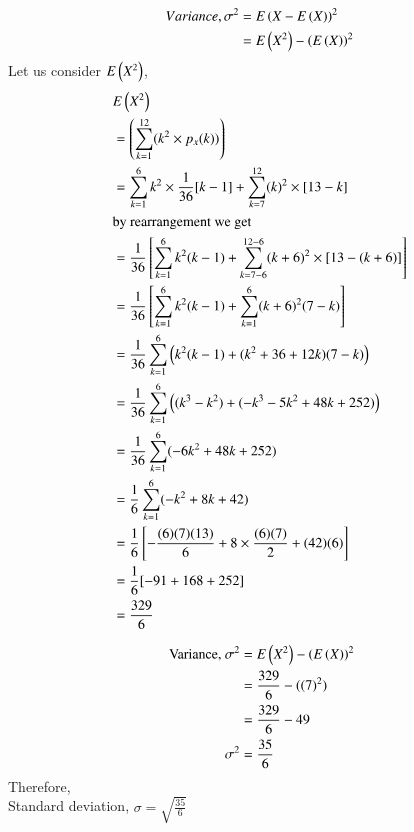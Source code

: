 \documentclass[journal,12pt,twocolumn]{IEEEtran}
\begin{document}
\begin{align}
  Variance,\sigma^2 &= E\left(X-E\left(X\right)\right)^2 \\
    &= E\left(X^2\right) - \left(E\left(X\right)\right)^2
\end{align}
Let us consider $E\left(X^2\right)$,
\begin{align}
    & E\left(X^2\right) \nonumber\\
    &= \left(\sum_{k=1}^{12}(k^2\times p_x(k))\right)\\
    &= \sum_{k=1}^{6}k^2\times\frac{1}{36}[k-1] + 
    \sum_{k=7}^{12}(k)^2\times[13-k]\\
    &\text{by rearrangement we get}\\
    &= \frac{1}{36}\left[\sum_{k=1}^{6}k^2(k-1) + \sum_{k=7-6}^{12-6}(k+6)^2\times[13-(k+6)]\right]\\
    &= \frac{1}{36}\left[\sum_{k=1}^{6}k^2(k-1) + \sum_{k=1}^{6}(k+6)^2(7-k)\right]\\
    &= \frac{1}{36}\sum_{k=1}^{6}\left(k^2(k-1) + (k^2+36+12k)(7-k)\right)\\
    &= \frac{1}{36}\sum_{k=1}^{6}\left((k^3-k^2) + (-k^3-5k^2+48k+252)\right)\\
    &= \frac{1}{36}\sum_{k=1}^{6}(-6k^2+48k+252)\\
    &= \frac{1}{6}\sum_{k=1}^{6}(-k^2+8k+42)\\
    &= \frac{1}{6}\left[ -\frac{(6)(7)(13)}{6} + 8\times\frac{(6)(7)}{2}+ (42)(6) \right]\\
    &= \frac{1}{6}[-91+168+252]\\
    &= \frac{329}{6}
\end{align}

\begin{align}
    \text{ Variance, }\sigma^2 &=E\left(X^2\right) - \left(E\left(X\right)\right)^2\\
    &= \frac{329}{6}- ((7)^2)\\
    &= \frac{329}{6} - 49\\
   \sigma^2 &= \frac{35}{6}
\end{align}
Therefore,\\
Standard deviation, $\sigma=\sqrt{\frac{35}{6}}$
\end{document}
